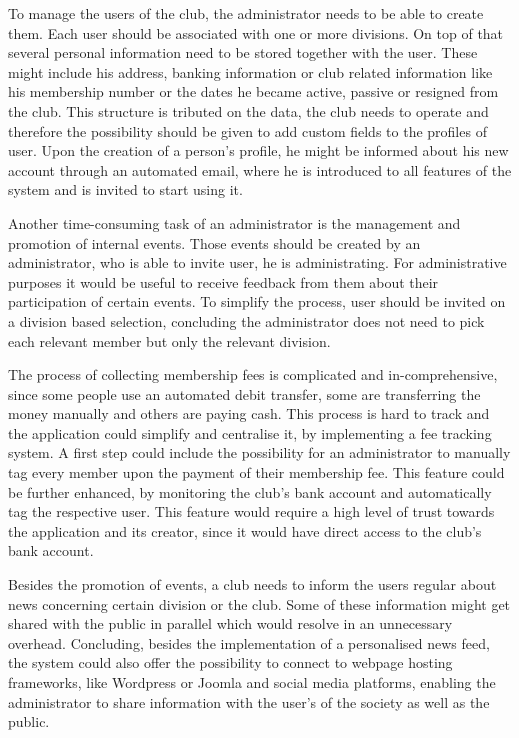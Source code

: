 To manage the users of the club, the administrator needs to be able to create them. Each user should be associated with one or more divisions. On top of that several personal information need to be stored together with the user. These might include his address, banking information or club related information like his membership number or the dates he became active, passive or resigned from the club. This structure is tributed on the data, the club needs to operate and therefore the possibility should be given to add custom fields to the profiles of user. Upon the creation of a person's profile, he might be informed about his new account through an automated email, where he is introduced to all features of the system and is invited to start using it.

Another time-consuming task of an administrator is the management and promotion of internal events. Those events should be created by an administrator, who is able to invite user, he is administrating. For administrative purposes it would be useful to receive feedback from them about their participation of certain events. To simplify the process, user should be invited on a division based selection, concluding the administrator does not need to pick each relevant member but only the relevant division.

The process of collecting membership fees is complicated and in-comprehensive, since some people use an automated debit transfer, some are transferring the money manually and others are paying cash. This process is hard to track and the application could simplify and centralise it, by implementing a fee tracking system. A first step could include the possibility for an administrator to manually tag every member upon the payment of their membership fee. This feature could be further enhanced, by monitoring the club's bank account and automatically tag the respective user. This feature would require a high level of trust towards the application and its creator, since it would have direct access to the club's bank account.

Besides the promotion of events, a club needs to inform the users regular about news concerning certain division or the club. Some of these information might get shared with the public in parallel which would resolve in an unnecessary overhead. Concluding, besides the implementation of a personalised news feed, the system could also offer the possibility to connect to webpage hosting frameworks, like Wordpress or Joomla and social media platforms, enabling the administrator to share information with the user's of the society as well as the public.

